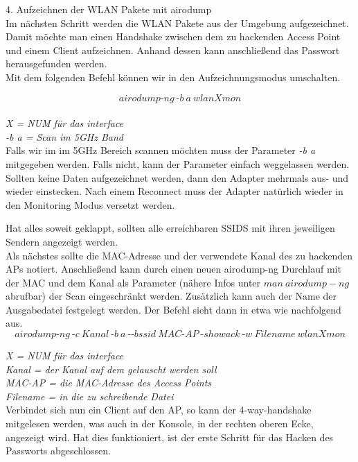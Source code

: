 {\Large 4. Aufzeichnen der WLAN Pakete mit airodump}\\
	
Im nächsten Schritt werden die WLAN Pakete aus der Umgebung aufgezeichnet. Damit möchte man einen Handshake zwischen dem zu hackenden Access Point und einem Client aufzeichnen. Anhand dessen kann anschließend das Passwort herausgefunden werden.\\

Mit dem folgenden Befehl können wir in den Aufzeichnungsmodus umschalten.
	
	$$airodump\text{-}ng~\text{-}b~a~wlanXmon$$\\
	 
	\textit{X = NUM für das interface}\\
	\textit{-b a = Scan im 5GHz Band}\\	
	
Falls wir im im 5GHz Bereich scannen möchten muss der Parameter \textit{-b a} mitgegeben werden. Falls nicht, kann der Parameter einfach weggelassen werden.\\	
Sollten keine Daten aufgezeichnet werden, dann den Adapter mehrmals aus- und wieder einstecken. 
Nach einem Reconnect muss der Adapter natürlich wieder in den Monitoring Modus versetzt werden.
	
Hat alles soweit geklappt, sollten alle erreichbaren SSIDS mit ihren jeweiligen Sendern angezeigt werden.\\ 
	
Als nächstes sollte die MAC-Adresse und der verwendete Kanal des zu hackenden APs notiert.
Anschließend kann durch einen neuen airodump-ng Durchlauf mit der MAC und dem Kanal als Parameter (nähere Infos unter \(man~airodump-ng\) abrufbar) der Scan
	eingeschränkt werden. Zusätzlich kann auch der Name der Ausgabedatei festgelegt werden. 
Der Befehl sieht dann in etwa wie nachfolgend aus.
	$$airodump\text{-}ng~\text{-}c~Kanal~\text{-}b~a~\text{-}\text{-}bssid~MAC\text{-}AP~\text{-}showack~\text{-}w~Filename~wlanXmon$$
	
		\textit{X = NUM für das interface}\\
		\textit{Kanal = der Kanal auf dem gelauscht werden soll}\\
		\textit{MAC-AP = die MAC-Adresse des Access Points}\\
		\textit{Filename = in die zu schreibende Datei}\\

	Verbindet sich nun ein Client auf den AP, so kann der 4-way-handshake mitgelesen werden, was auch in der Konsole, in der rechten oberen Ecke, angezeigt wird.
	Hat dies funktioniert, ist der erste Schritt für das Hacken des Passworts abgeschlossen.\\

